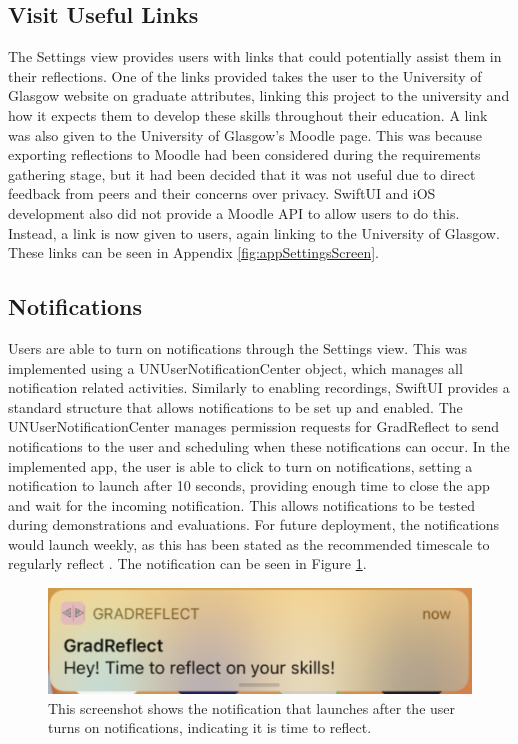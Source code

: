 \documentclass{l4proj}
\begin{document}
\subsection{Visit Useful Links}

The Settings view provides users with links that could potentially assist them in their reflections. One of the links provided takes the user to the University of Glasgow website on graduate attributes, linking this project to the university and how it expects them to develop these skills throughout their education. A link was also given to the University of Glasgow's Moodle page. This was because exporting reflections to Moodle had been considered during the requirements gathering stage, but it had been decided that it was not useful due to direct feedback from peers and their concerns over privacy. SwiftUI and iOS development also did not provide a Moodle API to allow users to do this. Instead, a link is now given to users, again linking to the University of Glasgow. These links can be seen in Appendix \ref{fig:appSettingsScreen}.

\subsection{Notifications}

Users are able to turn on notifications through the Settings view. This was implemented using a UNUserNotificationCenter object, which manages all notification related activities. Similarly to enabling recordings, SwiftUI provides a standard structure that allows notifications to be set up and enabled. The UNUserNotificationCenter manages permission requests for GradReflect to send notifications to the user and scheduling when these notifications can occur. In the implemented app, the user is able to click to turn on notifications, setting a notification to launch after 10 seconds, providing enough time to close the app and wait for the incoming notification. This allows notifications to be tested during demonstrations and evaluations. For future deployment, the notifications would launch weekly, as this has been stated as the recommended timescale to regularly reflect \citep{bruno_reflective_2018}. The notification can be seen in Figure \ref{fig:Notification}.

\begin{figure}[H]
    \centering
    \includegraphics[scale=0.4]{images/Notification.pdf}    
    \caption{This screenshot shows the notification that launches after the user turns on notifications, indicating it is time to reflect.}
    \label{fig:Notification} 
\end{figure}
\end{document}
